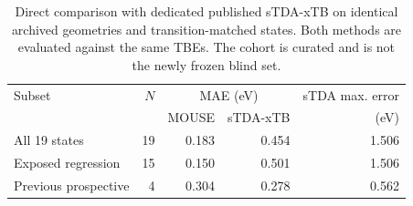 \begin{table}[htbp]
\centering\small
\caption{Direct comparison with dedicated published sTDA-xTB on identical archived geometries and transition-matched states. Both methods are evaluated against the same TBEs. The cohort is curated and is not the newly frozen blind set.}\label{tab:directstda}
\begin{tabular}{lrrrr}
\toprule Subset & $N$ & \multicolumn{2}{c}{MAE (eV)} & sTDA max. error\\
 & & MOUSE & sTDA-xTB & (eV)\\\midrule
All 19 states & 19 & 0.183 & 0.454 & 1.506 \\
Exposed regression & 15 & 0.150 & 0.501 & 1.506 \\
Previous prospective & 4 & 0.304 & 0.278 & 0.562 \\
\bottomrule\end{tabular}
\end{table}
